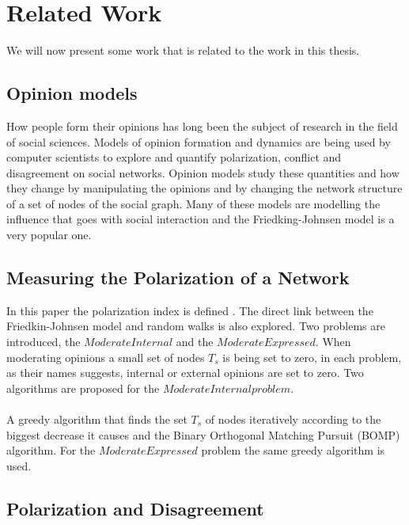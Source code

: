 \chapter{Related Work}
\label{ch:related}

We will now present some work that is related to the work in this thesis. 

\section{Opinion models}
\label{sec:opinionsModels}

How people form their opinions has long been the subject of research in the field of social sciences. Models of opinion formation and dynamics are being used  by computer scientists to explore and quantify polarization, conflict and disagreement on social networks. Opinion models study these quantities and how they change by manipulating the opinions and by changing the network structure of a set of nodes of the social graph. Many of these models are modelling the influence that goes with social interaction and the Friedking-Johnsen model is a very popular one.
\clearpage

\section{Measuring the Polarization of a Network}
\label{sec:Submission}

In this paper the polarization index is defined \cite{tsapMatakosTerzi}. The direct link between the Friedkin-Johnsen model and random walks is also explored. Two problems are introduced, the $ModerateInternal$ and the $ModerateExpressed$. When moderating opinions a small set of nodes $T_s$ is being set to zero, in each problem, as their names suggests, internal or external opinions are set to zero. Two algorithms are proposed for the $ModerateInternal problem$. 
\\
\\
A greedy algorithm that finds the set $T_s$ of nodes iteratively according to the biggest decrease it causes and the Binary Orthogonal Matching Pursuit (BOMP) algorithm. For the $ModerateExpressed$ problem the same greedy algorithm is used.


\section{Polarization and Disagreement}
\label{sec:polarizationDisareement}

